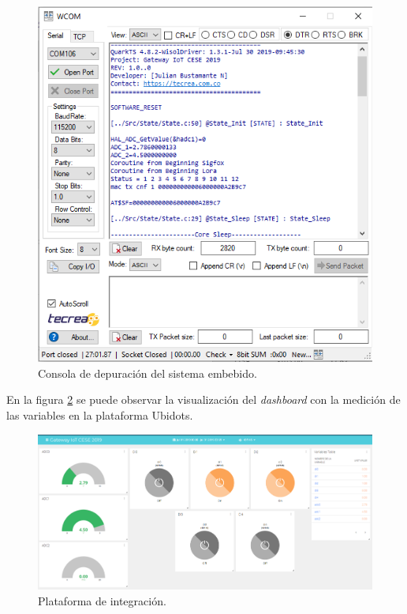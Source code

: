 \begin{figure}[H]
	\centering
	\includegraphics[scale=.6]{./Figures/IntegracionSL2.PNG}
	\caption{Consola de depuración del sistema embebido.}
	\label{fig:IntegracionSL2}
\end{figure}


En la figura \ref{fig:Ubidotsintegration} se puede observar la visualización del \textit{dashboard} con la medición de las variables en la plataforma Ubidots.

\begin{figure}[H]
	\centering
	\includegraphics[scale=.3]{./Figures/Ubidotsintegration.PNG}
	\caption{Plataforma de integración.}
	\label{fig:Ubidotsintegration}
\end{figure}









